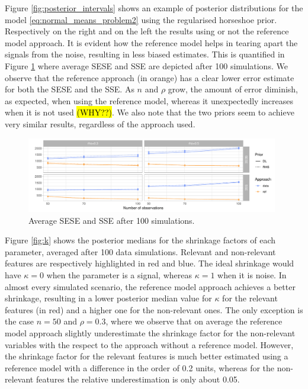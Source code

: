 \documentclass[american,]{article}
\theoremstyle{definition}
\begin{document}
Figure \ref{fig:posterior_intervals} shows an example of posterior distributions for the model \eqref{eq:normal_means_problem2} using the regularised horseshoe prior. Respectively on the right and on the left the results using or not the reference model approach. It is evident how the reference model helps in tearing apart the signals from the noise, resulting in less biased estimates. This is quantified in Figure \ref{fig:SESE_SSE} where average SESE and SSE are depicted after 100 simulations. We observe that the reference approach (in orange) has a clear lower error estimate for both the SESE and the SSE. As $n$ and $\rho$ grow, the amount of error diminish, as expected, when using the reference model, whereas it unexpectedly increases when it is not used \hl{(WHY??)}. We also note that the two priors seem to achieve very similar results, regardless of the approach used.

\begin{figure}[tp]
  \centering
  \includegraphics[width=0.98\textwidth]{graphics/SESE_SSE.pdf}
  \caption{Average SESE and SSE after 100 simulations.\\}
  \label{fig:SESE_SSE}
\end{figure}

Figure \ref{fig:k} shows the posterior medians for the shrinkage factors of each parameter, averaged after 100 data simulations. Relevant and non-relevant features are respectively highlighted in red and blue. The ideal shrinkage would have $\kappa=0$ when the parameter is a signal, whereas $\kappa=1$ when it is noise. In almost every simulated scenario, the reference model approach achieves a better shrinkage, resulting in a lower posterior median value for $\kappa$ for the relevant features (in red) and a higher one for the non-relevant ones. The only exception is the case $n=50$ and $\rho=0.3$, where we observe that on average the reference model approach slightly underestimate the shrinkage factor for the non-relevant variables with the respect to the approach without a reference model. However, the shrinkage factor for the relevant features is much better estimated using a reference model with a difference in the order of 0.2 units, whereas for the non-relevant features the relative underestimation is only about 0.05.
\end{document}

